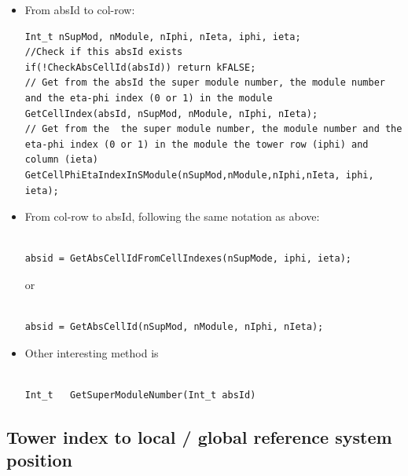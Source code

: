 \begin{itemize}
\item From absId to col-row: 

\begin{DDbox}{\linewidth}
\begin{lstlisting}
Int_t nSupMod, nModule, nIphi, nIeta, iphi, ieta;
//Check if this absId exists
if(!CheckAbsCellId(absId)) return kFALSE;
// Get from the absId the super module number, the module number and the eta-phi index (0 or 1) in the module
GetCellIndex(absId, nSupMod, nModule, nIphi, nIeta);
// Get from the  the super module number, the module number and the eta-phi index (0 or 1) in the module the tower row (iphi) and column (ieta) 
GetCellPhiEtaIndexInSModule(nSupMod,nModule,nIphi,nIeta, iphi, ieta); 
\end{lstlisting}
\end{DDbox}

\item From col-row to absId, following the same notation as above: 

\begin{DDbox}{\linewidth}
\begin{lstlisting}

absid = GetAbsCellIdFromCellIndexes(nSupMode, iphi, ieta);
\end{lstlisting}
\end{DDbox}

or

\begin{DDbox}{\linewidth}
\begin{lstlisting}

absid = GetAbsCellId(nSupMod, nModule, nIphi, nIeta);
\end{lstlisting}
\end{DDbox}

\item Other interesting method is

\begin{DDbox}{\linewidth}
\begin{lstlisting}

Int_t   GetSuperModuleNumber(Int_t absId)  
\end{lstlisting}
\end{DDbox}
\end{itemize}

\subsection{Tower index to local / global reference system position}
